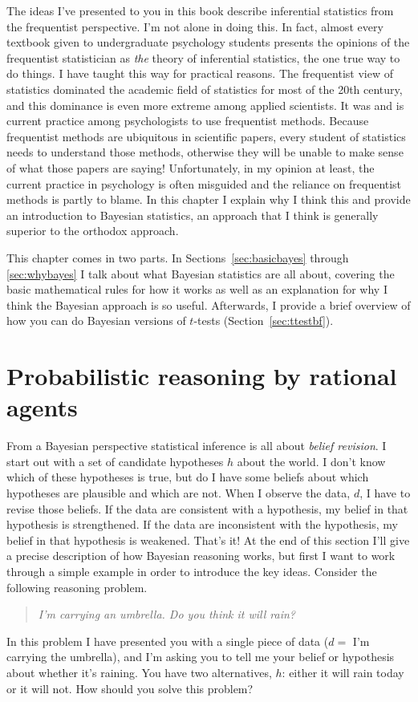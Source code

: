 \bigskip

The ideas I've presented to you in this book describe inferential statistics from the frequentist perspective. I'm not alone in doing this. In fact, almost every textbook given to undergraduate psychology students presents the opinions of the frequentist statistician as {\it the} theory of inferential statistics, the one true way to do things. I have taught this way for practical reasons. The frequentist view of statistics dominated the academic field of statistics for most of the 20th century, and this dominance is even more extreme among applied scientists. It was and is current practice among psychologists to use frequentist methods. Because frequentist methods are ubiquitous in scientific papers, every student of statistics needs to understand those methods, otherwise they will be unable to make sense of what those papers are saying! Unfortunately, in my opinion at least, the current practice in psychology is often misguided and the reliance on frequentist methods is partly to blame. In this chapter I explain why I think this and provide an introduction to Bayesian statistics, an approach that I think is generally superior to the orthodox approach.

This chapter comes in two parts. In Sections~\ref{sec:basicbayes} through \ref{sec:whybayes} I talk about what Bayesian statistics are all about, covering the basic mathematical rules for how it works as well as an explanation for why I think the Bayesian approach is so useful. Afterwards, I provide a brief overview of how you can do Bayesian versions of $t$-tests (Section~\ref{sec:ttestbf}).


\section{Probabilistic reasoning by rational agents\label{sec:basicbayes}}

From a Bayesian perspective statistical inference is all about {\it belief revision}. I start out with a set of candidate hypotheses $h$ about the world. I don't know which of these hypotheses is true, but do I have some beliefs about which hypotheses are plausible and which are not. When I observe the data, $d$, I have to revise those beliefs. If the data are consistent with a hypothesis, my belief in that hypothesis is strengthened. If the data are inconsistent with the hypothesis, my belief in that hypothesis is weakened. That's it! At the end of this section I'll give a precise description of how Bayesian reasoning works, but first I want to work through a simple example in order to introduce the key ideas. Consider the following reasoning problem.
\begin{quote}
{\it I'm carrying an umbrella. Do you think it will rain?}
\end{quote}
In this problem I have presented you with a single piece of data ($d =$ I'm carrying the umbrella), and I'm asking you to tell me your belief or hypothesis about whether it's raining. You have two alternatives, $h$: either it will rain today or it will not. How should you solve this problem? 

